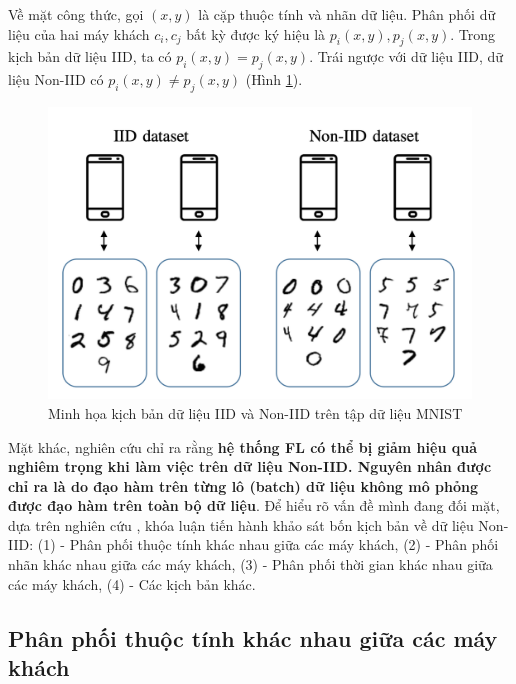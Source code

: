 Về mặt công thức, gọi $(x, y)$ là cặp thuộc tính và nhãn dữ liệu. Phân phối dữ liệu của hai máy khách $c_i, c_j$ bất kỳ được ký hiệu là $p_i(x,y), p_j(x,y)$. Trong kịch bản dữ liệu IID, ta có $p_i(x,y) = p_j(x,y)$. Trái ngược với dữ liệu IID, dữ liệu Non-IID có $p_i(x,y) \ne p_j(x,y)$ (Hình \ref{fig:iid_noniid}).

\begin{figure}[H]
    \centering
    \includegraphics[scale=0.7]{../images/iid_vs_noniid.png}
    \caption{Minh họa kịch bản dữ liệu IID và Non-IID trên tập dữ liệu MNIST \cite{hellstrom2020wireless}}
    \label{fig:iid_noniid}
\end{figure}


Mặt khác, nghiên cứu \cite{zhao2018federated} chỉ ra rằng \textbf{hệ thống FL có thể bị giảm hiệu quả nghiêm trọng khi làm việc trên dữ liệu Non-IID. Nguyên nhân được chỉ ra là do đạo hàm trên từng lô (batch) dữ liệu không mô phỏng được đạo hàm trên toàn bộ dữ liệu}. Để hiểu rõ vấn đề mình đang đối mặt, dựa trên nghiên cứu \cite{zhu2021federated}, khóa luận tiến hành khảo sát bốn kịch bản về dữ liệu Non-IID: (1) - Phân phối thuộc tính khác nhau giữa các máy khách, (2) - Phân phối nhãn khác nhau giữa các máy khách, (3) - Phân phối thời gian khác nhau giữa các máy khách, (4) - Các kịch bản khác.

\subsection{Phân phối thuộc tính khác nhau giữa các máy khách}

